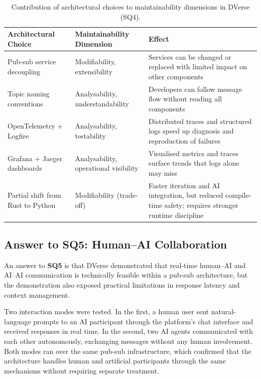 \documentclass[11pt]{article}
\begin{document}
\begin{table}[H]
    \centering
    \renewcommand{\arraystretch}{1.2}
    \begin{tabularx}{0.95\textwidth}{>{\RaggedRight\arraybackslash}p{}>{\RaggedRight\arraybackslash}p{}>{\RaggedRight\arraybackslash}X}
        \rowcolor{dverseblue!15}
        \toprule
        \textbf{Architectural Choice} & \textbf{Maintainability Dimension} & \textbf{Effect} \\
        \midrule
        Pub-sub service decoupling & Modifiability, extensibility & Services can be changed or replaced with limited impact on other components \\
        Topic naming conventions & Analysability, understandability & Developers can follow message flow without reading all components \\
        OpenTelemetry + Logfire & Analysability, testability & Distributed traces and structured logs speed up diagnosis and reproduction of failures \\
        Grafana + Jaeger dashboards & Analysability, operational visibility & Visualised metrics and traces surface trends that logs alone may miss \\
        Partial shift from Rust to Python & Modifiability (trade-off) & Faster iteration and AI integration, but reduced compile-time safety; requires stronger runtime discipline \\
        \bottomrule
    \end{tabularx}
    \caption{Contribution of architectural choices to maintainability dimensions in DVerse (SQ4).}
    \label{tab:sq4-maintainability}
\end{table}

\subsection{Answer to SQ5: Human--AI Collaboration}

An answer to \textbf{SQ5} is that DVerse demonstrated that real-time human--AI and AI--AI communication is technically feasible within a pub-sub architecture, but the demonstration also exposed practical limitations in response latency and context management.

Two interaction modes were tested. In the first, a human user sent natural-language prompts to an AI participant through the platform's chat interface and received responses in real time. In the second, two AI agents communicated with each other autonomously, exchanging messages without any human involvement. Both modes ran over the same pub-sub infrastructure, which confirmed that the architecture handles human and artificial participants through the same mechanisms without requiring separate treatment.
\end{document}
